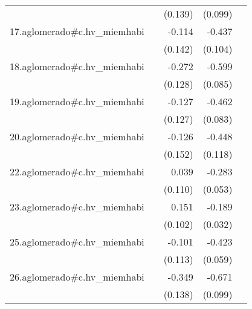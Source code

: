 {\begin{longtable}{l*{4}{D{.}{.}{-1}}}
            &                     &     (0.139)         &     (0.099)         &                     \\
\addlinespace
17.aglomerado#c.hv\_miemhabi&                     &      -0.114         &      -0.437\sym{***}&                     \\
            &                     &     (0.142)         &     (0.104)         &                     \\
\addlinespace
18.aglomerado#c.hv\_miemhabi&                     &      -0.272\sym{*}  &      -0.599\sym{***}&                     \\
            &                     &     (0.128)         &     (0.085)         &                     \\
\addlinespace
19.aglomerado#c.hv\_miemhabi&                     &      -0.127         &      -0.462\sym{***}&                     \\
            &                     &     (0.127)         &     (0.083)         &                     \\
\addlinespace
20.aglomerado#c.hv\_miemhabi&                     &      -0.126         &      -0.448\sym{***}&                     \\
            &                     &     (0.152)         &     (0.118)         &                     \\
\addlinespace
22.aglomerado#c.hv\_miemhabi&                     &       0.039         &      -0.283\sym{***}&                     \\
            &                     &     (0.110)         &     (0.053)         &                     \\
\addlinespace
23.aglomerado#c.hv\_miemhabi&                     &       0.151         &      -0.189\sym{***}&                     \\
            &                     &     (0.102)         &     (0.032)         &                     \\
\addlinespace
25.aglomerado#c.hv\_miemhabi&                     &      -0.101         &      -0.423\sym{***}&                     \\
            &                     &     (0.113)         &     (0.059)         &                     \\
\addlinespace
26.aglomerado#c.hv\_miemhabi&                     &      -0.349\sym{*}  &      -0.671\sym{***}&                     \\
            &                     &     (0.138)         &     (0.099)         &                     \\

\end{longtable}}
